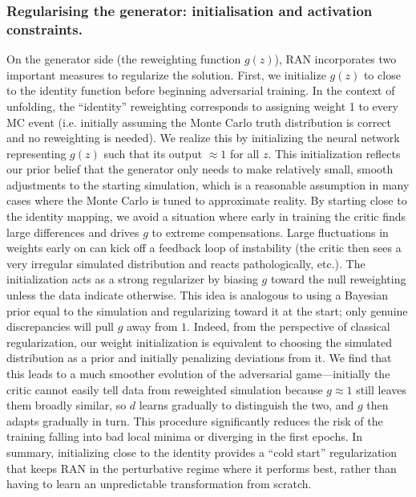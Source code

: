 {{        \subsubsection{Regularising the generator: initialisation and activation constraints.}
            On the generator side (the reweighting function $g(z)$), RAN incorporates two important measures to regularize the solution.  First, we initialize $g(z)$ to close to the identity function before beginning adversarial training.
            In the context of unfolding, the “identity” reweighting corresponds to assigning weight 1 to every MC event (i.e. initially assuming the Monte Carlo truth distribution is correct and no reweighting is needed).
            We realize this by initializing the neural network representing $g(z)$ such that its output $\approx 1$ for all $z$.
            This initialization reflects our prior belief that the generator only needs to make relatively small, smooth adjustments to the starting simulation, which is a reasonable assumption in many cases where the Monte Carlo is tuned to approximate reality.
            By starting close to the identity mapping, we avoid a situation where early in training the critic finds large differences and drives $g$ to extreme compensations.
            Large fluctuations in weights early on can kick off a feedback loop of instability (the critic then sees a very irregular simulated distribution and reacts pathologically, etc.).
            The initialization acts as a strong regularizer by biasing $g$ toward the null reweighting unless the data indicate otherwise.
            This idea is analogous to using a Bayesian prior equal to the simulation and regularizing toward it at the start; only genuine discrepancies will pull $g$ away from \(1\).
            Indeed, from the perspective of classical regularization, our weight initialization is equivalent to choosing the simulated distribution as a prior and initially penalizing deviations from it.
            We find that this leads to a much smoother evolution of the adversarial game---initially the critic cannot easily tell data from reweighted simulation because $g\approx 1$ still leaves them broadly similar, so $d$ learns gradually to distinguish the two, and $g$ then adapts gradually in turn.
            This procedure significantly reduces the risk of the training falling into bad local minima or diverging in the first epochs.
            In summary, initializing close to the identity provides a “cold start” regularization that keeps RAN in the perturbative regime where it performs best, rather than having to learn an unpredictable transformation from scratch.\kd{}

}}
